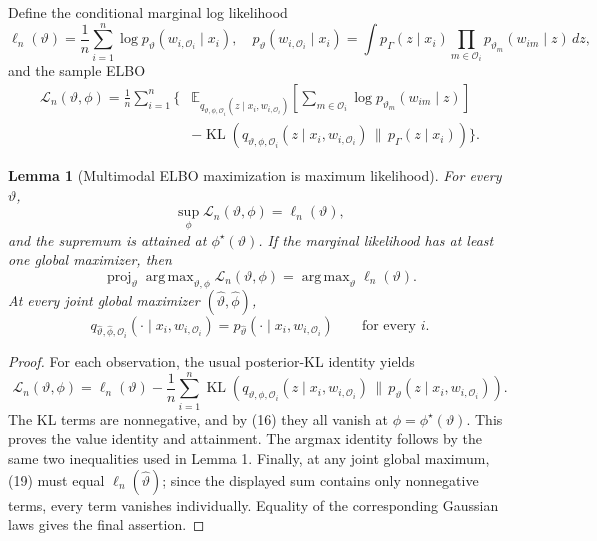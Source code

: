 \documentclass[11pt]{article}
\DeclareMathOperator{\KL}{KL}
\DeclareMathOperator*{\argmaxop}{arg\,max}
\DeclareMathOperator{\proj}{proj}
\newcommand{\E}{\mathbb{E}}
\newtheorem{lemma}{Lemma}
\theoremstyle{remark}
\begin{document}
Define the conditional marginal log likelihood
\begin{equation}
\ell_n(\vartheta)
=
\frac{1}{n}\sum_{i=1}^n
\log p_\vartheta(w_{i,\mathcal{O}_i}\mid x_i),
\quad
p_\vartheta(w_{i,\mathcal{O}_i}\mid x_i)
=
\int p_\Gamma(z\mid x_i)
\prod_{m\in\mathcal{O}_i}p_{\vartheta_m}(w_{im}\mid z)\,dz,
\tag{17}
\end{equation}
and the sample ELBO
\begin{equation}
\begin{aligned}
\mathcal{L}_n(\vartheta,\phi)
=\frac{1}{n}\sum_{i=1}^n
\Bigg\{&
\E_{q_{\vartheta,\phi,\mathcal{O}_i}(z\mid x_i,w_{i,\mathcal{O}_i})}
\left[
\sum_{m\in\mathcal{O}_i}\log p_{\vartheta_m}(w_{im}\mid z)
\right]\\
&-
\KL\!\left(
q_{\vartheta,\phi,\mathcal{O}_i}(z\mid x_i,w_{i,\mathcal{O}_i})
\,\|\,
p_\Gamma(z\mid x_i)
\right)
\Bigg\}.
\end{aligned}
\tag{18}
\end{equation}

\begin{lemma}[Multimodal ELBO maximization is maximum likelihood]
For every $\vartheta$,
\[
\sup_\phi\mathcal{L}_n(\vartheta,\phi)=\ell_n(\vartheta),
\]
and the supremum is attained at $\phi^\star(\vartheta)$. If the marginal likelihood has at least one global maximizer, then
\[
\proj_\vartheta\argmaxop_{\vartheta,\phi}\mathcal{L}_n(\vartheta,\phi)
=
\argmaxop_\vartheta\ell_n(\vartheta).
\]
At every joint global maximizer $(\widehat\vartheta,\widehat\phi)$,
\[
q_{\widehat\vartheta,\widehat\phi,\mathcal{O}_i}
(\cdot\mid x_i,w_{i,\mathcal{O}_i})
=
p_{\widehat\vartheta}
(\cdot\mid x_i,w_{i,\mathcal{O}_i})
\qquad\text{for every }i.
\]
\end{lemma}

\begin{proof}
For each observation, the usual posterior-KL identity yields
\begin{equation}
\mathcal{L}_n(\vartheta,\phi)
=
\ell_n(\vartheta)
-
\frac{1}{n}\sum_{i=1}^n
\KL\!\left(
q_{\vartheta,\phi,\mathcal{O}_i}(z\mid x_i,w_{i,\mathcal{O}_i})
\,\|\,
p_\vartheta(z\mid x_i,w_{i,\mathcal{O}_i})
\right).
\tag{19}
\end{equation}
The KL terms are nonnegative, and by (16) they all vanish at
$\phi=\phi^\star(\vartheta)$. This proves the value identity and attainment. The argmax identity follows by the same two inequalities used in Lemma 1. Finally, at any joint global maximum, (19) must equal $\ell_n(\widehat\vartheta)$; since the displayed sum contains only nonnegative terms, every term vanishes individually. Equality of the corresponding Gaussian laws gives the final assertion.
\end{proof}
\end{document}
